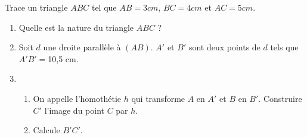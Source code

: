 \documentclass[openany]{book}
\begin{document}
\Exe

Trace un triangle $ABC$ tel que $AB = 3 cm$, $BC = 4 cm$ et $AC = 5 cm$.
\begin{enumerate}
\item Quelle est la nature du triangle $ABC$ ?
\item Soit $d$ une droite parallèle à $(AB)$. $A'$ et $B'$ sont deux points de $d$ tels que $A'B' = $10,5 cm.
\item 
\begin{enumerate}
\item On appelle l'homothétie $h$ qui transforme $A$ en $A'$ et $B$ en $B'$. Construire $C'$ l'image du point $C$ par $h$.
\item Calcule $B'C'$.
\end{enumerate}
\end{enumerate}
\end{document}
